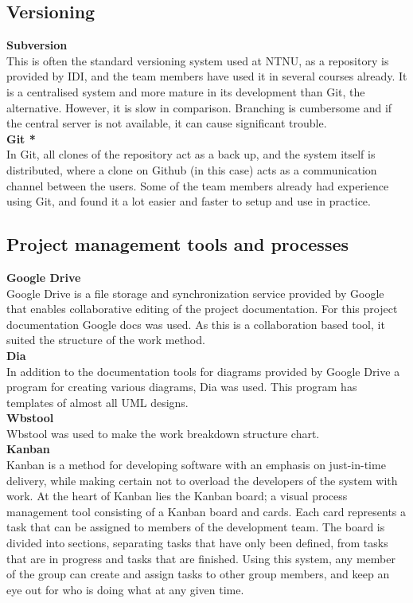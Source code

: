 \subsection{Versioning}
\textbf{Subversion}\\
This is often the standard versioning system used at NTNU, as a repository is provided by IDI, and the team members have used it in several courses already. It is a centralised system and more mature in its development than Git, the alternative. However, it is slow in comparison. Branching is cumbersome and if the central server is not available, it can cause significant trouble.
\\ \newline
\textbf{Git  *}\\
In Git, all clones of the repository act as a back up, and the system itself is distributed, where a clone on Github (in this case) acts as a communication channel between the users. Some of the team members already had experience using Git, and found it a lot easier and faster to setup and use in practice.


\subsection{Project management tools and processes}
\textbf{Google Drive}\\
Google Drive is a file storage and synchronization service provided by Google that enables collaborative editing of the project documentation. For this project documentation Google docs was used. As this is a collaboration based tool, it suited the structure of the work method. 
\\ \newline
\textbf{Dia}\\
In addition to the documentation tools for diagrams provided by Google Drive a program for creating various diagrams, Dia was used. This program has templates of almost all UML designs. 
\\ \newline
\textbf{Wbstool}\\
Wbstool was used to make the work breakdown structure chart. 
\\ \newline
\textbf{Kanban}\\
Kanban is a method for developing software with an emphasis on just-in-time delivery, while making certain not to overload the developers of the system with work. At the heart of Kanban lies the Kanban board; a visual process management tool consisting of a Kanban board and cards. Each card represents a task that can be assigned to members of the development team. The board is divided into sections, separating tasks that have only been defined, from tasks that are in progress and tasks that are finished. Using this system, any member of the group can create and assign tasks to other group members, and keep an eye out for who is doing what at any given time.


